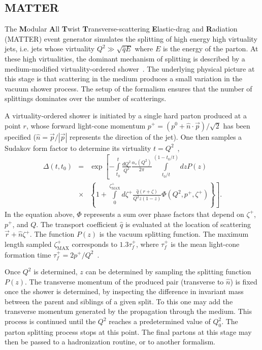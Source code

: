 \documentclass[aps,prc,twocolumn,floatfix,superscriptaddress,nofootinbib]{revtex4}
\begin{document}
\subsection{MATTER}
\label{subsec:MATTER}


The {\bf M}odular {\bf A}ll {\bf T}wist {\bf T}ransverse-scattering {\bf E}lastic-drag and {\bf R}adiation (MATTER) event generator simulates the splitting of high energy high virtuality jets, i.e. jets whose virtuality 
$Q^{2}  \gg \sqrt{\hat{q}E} $ where $E$ is the energy of the parton. At these high virtualities, the dominant mechanism of splitting is described by a medium-modified virtuality-ordered shower~\cite{Majumder:2009ge,Majumder:2009zu,Wang:2001ifa,Majumder:2011uk}. The underlying physical picture at this stage is that scattering in the medium produces a small variation in the vacuum shower process. The setup of the formalism ensures that the number of splittings dominates over the number of scatterings. 

A virtuality-ordered shower is initiated by a single hard parton produced at a point $r$, whose forward light-cone 
momentum $p^{+} = (p^0 + \hat{n}\cdot \vec{p} )/\sqrt{2}$ has been specified ($\hat{n} = \vec{p}/| \vec{p} |$ represents the direction of the jet). One then samples a Sudakov form factor to determine its virtuality $ t = Q^{2}$~\cite{Majumder:2013re,Majumder:2014gda}, 
\begin{eqnarray}
\Delta(t,t_{0}) &=& \exp \left[- \int\limits_{t_{0}}^{t}  \frac{dQ^{2}}{Q^{2}} \frac{\alpha_{s} (Q^{2})}{2\pi} \int\limits_{t_{0}/t}^{(1- t_{0}/t)}  dz P(z) \right. \\
& \times &
\left. \left\{ 1 +  \int\limits_{0}^{\zeta^{+}_{\mathrm{MAX}}}  d\zeta^{+} \frac{\hat{q} ( r + \zeta)  }{Q^{2} z(1-z)}  \Phi ( Q^{2}, p^{+}, \zeta^{+}  ) \right\} \right]. \nonumber
\end{eqnarray}
In the equation above, $\Phi$ represents a sum over phase factors that depend on $\zeta^+$, $p^+$, and $Q$. The transport coefficient $\hat{q}$ is evaluated at the 
location of scattering $\vec{r} + \hat{n} \zeta^{+}$. The function $P(z)$ is the 
vacuum splitting function. The maximum length sampled $\zeta^+_{\mathrm{MAX}}$ corresponds to $1.3 \tau_f^+$, where $\tau_f^+$ is the mean light-cone 
formation time $\tau^+_f = 2 p^+/Q^2$~\cite{Kordell:2017hmi}. 

Once $Q^2$ is determined, $z$ can be determined by sampling the splitting function $P(z)$. The transverse momentum of the produced pair 
(transverse to $\hat{n}$) is fixed once the shower is determined, by inspecting the difference in invariant mass between the parent and siblings of a
given split. To this one may add the transverse momentum generated by the propagation through the medium. This process is continued until the $Q^2$ reaches a predetermined value of $Q_0^2$. The parton splitting process stops at this point. The final partons at this stage may then be passed to a hadronization routine, or to another formalism. 
\end{document}
